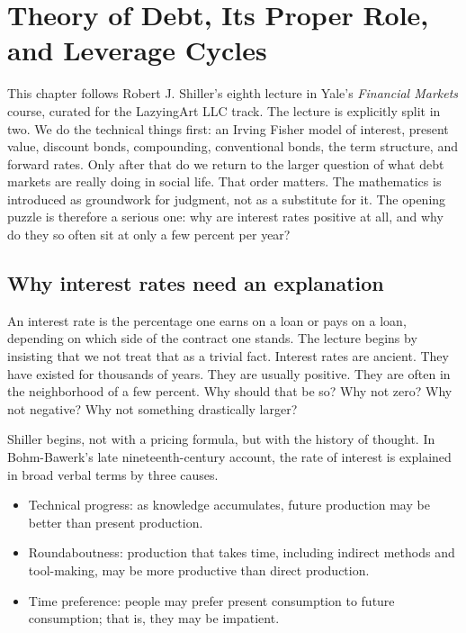 \chapter{Theory of Debt, Its Proper Role, and Leverage Cycles}

This chapter follows Robert J. Shiller's eighth lecture in Yale's \textit{Financial Markets} course, curated for the LazyingArt LLC track. The lecture is explicitly split in two. We do the technical things first: an Irving Fisher model of interest, present value, discount bonds, compounding, conventional bonds, the term structure, and forward rates. Only after that do we return to the larger question of what debt markets are really doing in social life. That order matters. The mathematics is introduced as groundwork for judgment, not as a substitute for it. The opening puzzle is therefore a serious one: why are interest rates positive at all, and why do they so often sit at only a few percent per year?

\section{Why interest rates need an explanation}

An interest rate is the percentage one earns on a loan or pays on a loan, depending on which side of the contract one stands. The lecture begins by insisting that we not treat that as a trivial fact. Interest rates are ancient. They have existed for thousands of years. They are usually positive. They are often in the neighborhood of a few percent. Why should that be so? Why not zero? Why not negative? Why not something drastically larger?

Shiller begins, not with a pricing formula, but with the history of thought. In Bohm-Bawerk's late nineteenth-century account, the rate of interest is explained in broad verbal terms by three causes.

\begin{itemize}
\item Technical progress: as knowledge accumulates, future production may be better than present production.
\item Roundaboutness: production that takes time, including indirect methods and tool-making, may be more productive than direct production.
\item Time preference: people may prefer present consumption to future consumption; that is, they may be impatient.
\end{itemize}


